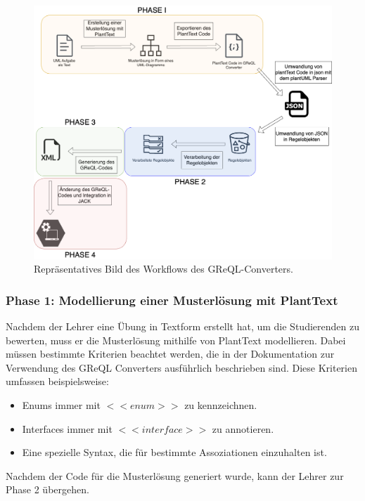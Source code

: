 \begin{figure}
    \centering
    \includegraphics[width=15cm]{images/workflow}
    \caption{Repräsentatives Bild des Workflows des GReQL-Converters.}
    \label{fig:workflow}
\end{figure}

\subsubsection{Phase 1: Modellierung einer Musterlösung mit PlantText}

Nachdem der Lehrer eine Übung in Textform erstellt hat, um die Studierenden zu bewerten, muss er die Musterlösung
mithilfe von PlantText modellieren. Dabei müssen bestimmte Kriterien beachtet werden, die in der Dokumentation zur 
Verwendung des GReQL Converters ausführlich beschrieben sind. Diese Kriterien umfassen beispielsweise:

\begin{itemize}
    \item Enums immer mit $<<enum>>$ zu kennzeichnen.
    \item Interfaces immer mit $<<interface>>$ zu annotieren.
    \item Eine spezielle Syntax, die für bestimmte Assoziationen einzuhalten ist.
\end{itemize}

Nachdem der Code für die Musterlösung generiert wurde, kann der Lehrer zur Phase 2 übergehen.


